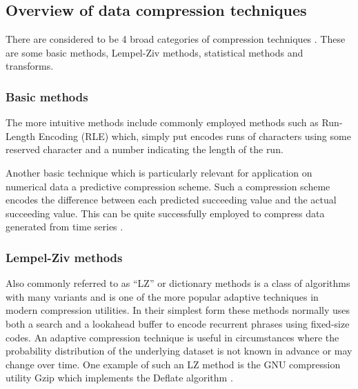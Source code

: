 \documentclass{acm_proc_article-sp}
\begin{document}
\subsection{Overview of data compression techniques}
There are considered to be 4 broad categories of compression techniques \cite{salomon2004data}. These are some basic methods, Lempel-Ziv methods, statistical methods 
and transforms.
\subsubsection{Basic methods}
The more intuitive methods include commonly employed methods such as Run-Length Encoding (RLE) which, simply put encodes runs of characters using some reserved 
character and a number indicating the length of the run.

Another basic technique which is particularly relevant for application on numerical data a predictive compression scheme. Such a compression scheme encodes the 
difference between each predicted succeeding value and the actual succeeding value. This can be quite successfully employed to compress data generated from time series \cite{engelson2000lossless}.
\subsubsection{Lempel-Ziv methods}
Also commonly referred to as “LZ” or dictionary methods is a class of algorithms with many variants and is one of the more popular adaptive techniques in modern 
compression utilities. In their simplest form these methods normally uses both a search and a lookahead buffer to encode recurrent phrases using fixed-size codes. An 
adaptive compression technique is useful in circumstances where the probability distribution of the underlying dataset is not known in advance or may change over time. 
One example of such an LZ method is the GNU compression utility Gzip which implements the Deflate algorithm \cite[ch. 3]{salomon2004data}.
\end{document}
